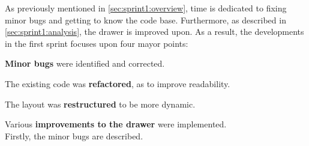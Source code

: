 As previously mentioned in \cref{sec:sprint1:overview}, time is dedicated to fixing minor bugs and getting to know the code base.
Furthermore, as described in \cref{sec:sprint1:analysis}, the drawer is improved upon.
As a result, the developments in the first sprint focuses upon four mayor points:

\textbf{Minor bugs} were identified and corrected.

The existing code was \textbf{refactored}, as to improve readability.

The layout was \textbf{restructured} to be more dynamic.

Various \textbf{improvements to the drawer} were implemented.\\

Firstly, the minor bugs are described.